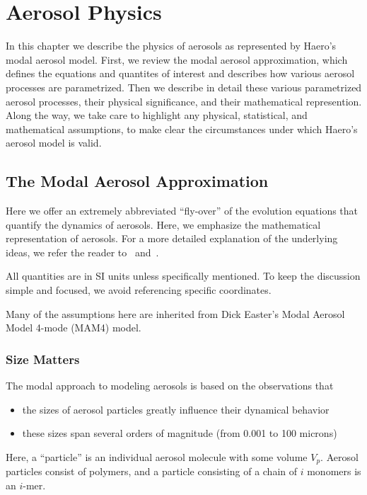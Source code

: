 \chapter{Aerosol Physics}

In this chapter we describe the physics of aerosols as represented by Haero's
modal aerosol model. First, we review the modal aerosol approximation, which
defines the equations and quantites of interest and describes how various
aerosol processes are parametrized. Then we describe in detail these various
parametrized aerosol processes, their physical significance, and their
mathematical represention. Along the way, we take care to highlight any
physical, statistical, and mathematical assumptions, to make clear the
circumstances under which Haero's aerosol model is valid.

\section{The Modal Aerosol Approximation}

Here we offer an extremely abbreviated ``fly-over'' of the evolution equations
that quantify the dynamics of aerosols. Here, we emphasize the mathematical
representation of aerosols. For a more detailed explanation of the underlying
ideas, we refer the reader to~\cite{Whitby1991} and~\cite{Friedlander1977}.

All quantities are in SI units unless specifically mentioned. To keep the
discussion simple and focused, we avoid referencing specific coordinates.

Many of the assumptions here are inherited from Dick Easter's Modal Aerosol
Model 4-mode (MAM4) model.

\subsection*{Size Matters}

The modal approach to modeling aerosols is based on the observations that

\begin{itemize}
  \item the sizes of aerosol particles greatly influence their dynamical
        behavior
  \item these sizes span several orders of magnitude (from 0.001 to 100 microns)
\end{itemize}

Here, a ``particle'' is an individual aerosol molecule with some volume $V_p$.
Aerosol particles consist of polymers, and a particle consisting of a chain of
$i$ monomers is an $i$-mer.

